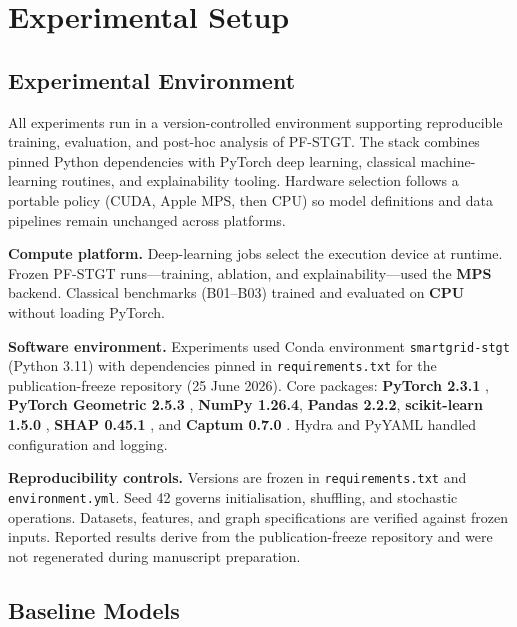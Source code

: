 \section{Experimental Setup}\label{sec:experimental_setup}

\subsection{Experimental Environment}\label{subsection:experimental_environment}

All experiments run in a version-controlled environment supporting reproducible training, evaluation, and post-hoc analysis of PF-STGT. The stack combines pinned Python dependencies with PyTorch deep learning, classical machine-learning routines, and explainability tooling. Hardware selection follows a portable policy (CUDA, Apple MPS, then CPU) so model definitions and data pipelines remain unchanged across platforms.

\textbf{Compute platform.} Deep-learning jobs select the execution device at runtime. Frozen PF-STGT runs---training, ablation, and explainability---used the \textbf{MPS} backend. Classical benchmarks (B01--B03) trained and evaluated on \textbf{CPU} without loading PyTorch.

\textbf{Software environment.} Experiments used Conda environment \texttt{smartgrid-stgt} (Python 3.11) with dependencies pinned in \texttt{requirements.txt} for the publication-freeze repository (25 June 2026). Core packages: \textbf{PyTorch 2.3.1} \cite{Paszke2019PyTorch}, \textbf{PyTorch Geometric 2.5.3} \cite{Fey2019PyG}, \textbf{NumPy 1.26.4}, \textbf{Pandas 2.2.2}, \textbf{scikit-learn 1.5.0} \cite{Pedregosa2011ScikitLearn}, \textbf{SHAP 0.45.1} \cite{Lundberg2017SHAP}, and \textbf{Captum 0.7.0} \cite{Kokhlikyan2020Captum}. Hydra and PyYAML handled configuration and logging.

\textbf{Reproducibility controls.} Versions are frozen in \texttt{requirements.txt} and \texttt{environment.yml}. Seed 42 governs initialisation, shuffling, and stochastic operations. Datasets, features, and graph specifications are verified against frozen inputs. Reported results derive from the publication-freeze repository and were not regenerated during manuscript preparation.

\subsection{Baseline Models}\label{subsection:baseline_models}


